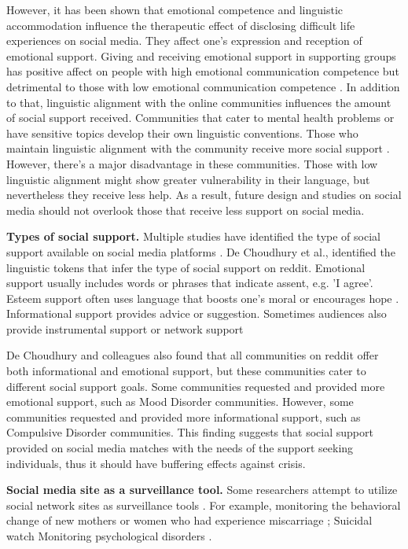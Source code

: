 However, it has been shown that emotional competence and linguistic accommodation influence the therapeutic effect of disclosing difficult life experiences on social media. They affect one's expression and reception of emotional support. Giving and receiving emotional support in supporting groups has positive affect on people with high emotional communication competence but detrimental to those with low emotional communication competence \cite{yoo2014giving}. In addition to that, linguistic alignment with the online communities influences the amount of social support received. Communities that cater to mental health problems or have sensitive topics develop their own linguistic conventions. Those who maintain linguistic alignment with the community receive more social support \cite{Sharma2018support}. However, there's a major disadvantage in these communities. Those with low linguistic alignment might show greater vulnerability in their language, but nevertheless they receive less help. As a result, future design and studies on social media should not overlook those that receive less support on social media.

\textbf{Types of social support.} Multiple studies have identified the type of social support available on social media platforms \cite{yoo2014giving}. De Choudhury et al.,
\citet{Sharma2018support} identified the linguistic tokens that infer the type of social support on reddit. Emotional support usually includes words or phrases that indicate assent, e.g. 'I agree'. Esteem support often uses language that boosts one's moral or encourages hope \cite{Sharma2018support}. Informational support provides advice or suggestion. Sometimes audiences also provide instrumental support or network support \cite{de2017language}

 De Choudhury and colleagues \citet{Sharma2018support} also found that all communities on reddit offer both informational and emotional support, but these communities cater to different social support goals. Some communities requested and provided more emotional support, such as Mood Disorder communities. However, some communities requested and provided more informational support, such as Compulsive Disorder communities. This finding suggests that social support provided on social media matches with the needs of the support seeking individuals, thus it should have buffering effects against crisis.

\textbf{Social media site as a surveillance tool.} Some researchers attempt to utilize social network sites as surveillance tools \cite{reece2017forecasting}. For example, monitoring the behavioral change of new mothers \cite{de_choudhury_major_2013} or women who had experience miscarriage \cite{andalibi_social_2016}; Suicidal watch \cite{de2017language, de2016discovering} Monitoring psychological disorders \cite{andalibi_sensitive_2017,de2013predicting}.

